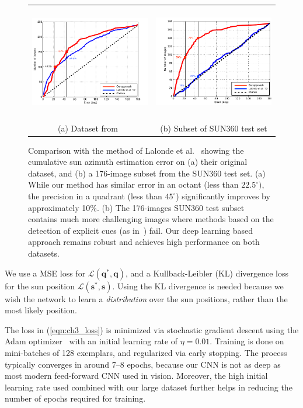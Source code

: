 \begin{figure}[!th]
    \centering
    \footnotesize
    \setlength{\tabcolsep}{1pt}
    \begin{tabular}{cc}
    \includegraphics[height=5cm]{figures/compare_jf12/lalonde-db-margin.pdf} & 
    \includegraphics[height=5cm]{figures/compare_jf12/sun360-db-margin.pdf} \\
    (a) Dataset from~\cite{lalonde-ijcv-12} &
    (b) Subset of SUN360 test set
    \end{tabular}
    \vspace{.5em} 
    \caption{Comparison with the method of Lalonde et al.~\cite{lalonde-ijcv-12} showing the cumulative sun azimuth estimation error on (a) their original dataset, and (b) a 176-image subset from the SUN360 test set. (a) While our method has similar error in an octant (less than $22.5^\circ)$, the precision in a quadrant (less than $45^\circ$) significantly improves by approximately 10\%. (b) The 176-images SUN360 test subset contains much more challenging images where methods based on the detection of explicit cues (as in~\cite{lalonde-ijcv-12}) fail. Our deep learning based approach remains robust and achieves high performance on both datasets.}
    \label{fig:comparison-lalonde12}
\end{figure}

We use a MSE loss for $\mathcal{L}(\mathbf{q}^*, \mathbf{q})$, and a Kullback-Leibler (KL) divergence loss for the sun position $\mathcal{L}(\mathbf{s}^*, \mathbf{s})$. Using the KL divergence is needed because we wish the network to learn a \emph{distribution} over the sun positions, rather than the most likely position. 

The loss in (\ref{eqn:ch3_loss}) is minimized via stochastic gradient descent using the Adam optimizer~\cite{kingma-iclr-15} with an initial learning rate of $\eta=0.01$. Training is done on mini-batches of 128 exemplars, and regularized via early stopping. The process typically converges in around 7--8 epochs, because our CNN is not as deep as most modern feed-forward CNN used in vision. Moreover, the high initial learning rate used combined with our large dataset further helps in reducing the number of epochs required for training.



